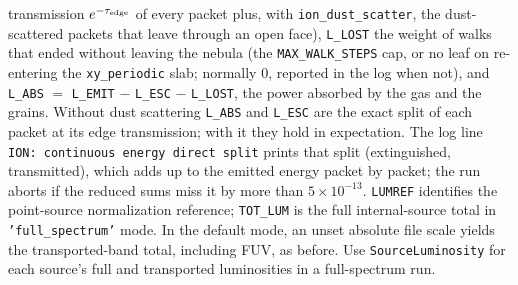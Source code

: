 \documentclass[english,a4paper]{my_memo}
\newcommand{\code}[1]{\texttt{#1}}
\begin{document}
transmission $e^{-\tau_{\rm edge}}$ of every packet plus, with
\code{ion\_dust\_scatter}, the dust-scattered packets that leave through
an open face), \code{L\_LOST} the weight of walks that ended without
leaving the nebula (the \code{MAX\_WALK\_STEPS} cap, or no leaf on
re-entering the \code{xy\_periodic} slab; normally 0, reported in the log
when not), and \code{L\_ABS} $=$ \code{L\_EMIT} $-$ \code{L\_ESC} $-$
\code{L\_LOST}, the power absorbed by the gas and the grains.  Without
dust scattering \code{L\_ABS} and \code{L\_ESC} are the exact split of
each packet at its edge transmission; with it they hold in expectation.
The log line \code{ION: continuous energy direct split} prints that split
(extinguished, transmitted), which adds up to the emitted energy packet by
packet; the run aborts if the reduced sums miss it by more than
$5{\times}10^{-13}$.
\code{LUMREF} identifies the point-source normalization reference;
\code{TOT\_LUM} is the full internal-source total in
\code{'full\_spectrum'} mode.  In the default mode, an unset absolute
file scale yields the transported-band total, including FUV, as before.
Use \code{SourceLuminosity} for each source's full and transported
luminosities in a full-spectrum run.
\end{document}
